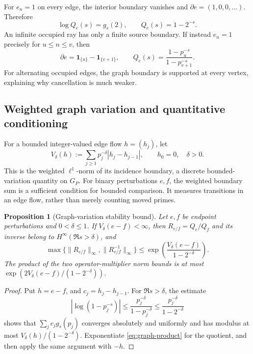 \documentclass[12pt,letterpaper]{article}
\newtheorem{proposition}[theorem]{Proposition}
\theoremstyle{definition}
\theoremstyle{remark}
\begin{document}
For \(e_n=1\) on every edge, the interior boundary vanishes and
\(\partial e=(1,0,0,\ldots)\).  Therefore
\[
 \log Q_e(s)=g_s(2),\qquad Q_e(s)=1-2^{-s}.
\]
An infinite occupied ray has only a finite source boundary.  If instead
\(e_n=1\) precisely for \(u\le n\le v\), then
\[
 \partial e=\mathbf 1_{\{u\}}-\mathbf 1_{\{v+1\}},
 \qquad Q_e(s)=\frac{1-p_u^{-s}}{1-p_{v+1}^{-s}}.
\]
For alternating occupied edges, the graph boundary is supported at
every vertex, explaining why cancellation is much weaker.

\subsection{Weighted graph variation and quantitative conditioning}

For a bounded integer-valued edge flow \(h=(h_j)\), let
\begin{equation}\label{eq:graph-TV}
 V_\delta(h):=\sum_{j\ge1}p_j^{-\delta}
                  |h_j-h_{j-1}|,\qquad h_0=0,\quad\delta>0.
\end{equation}
This is the weighted \(\ell^1\)-norm of its incidence boundary,
a discrete bounded-variation quantity on \(G_P\).
For binary perturbations $e,f$, the weighted boundary sum is a sufficient
condition for bounded comparison. It measures transitions in an edge flow,
rather than merely counting moved primes.

\begin{proposition}[Graph-variation stability bound]
\label{prop:graph-conditioning}
Let \(e,f\) be endpoint perturbations and \(0<\delta\le1\).
If \(V_\delta(e-f)<\infty\), then
\(R_{e/f}=Q_e/Q_f\) and its inverse belong to
\(H^\infty(\Re s>\delta)\), and
\begin{equation}\label{eq:graph-stability}
 \max\{\|R_{e/f}\|_\infty,\|R_{e/f}^{-1}\|_\infty\}
 \le \exp\!\left(\frac{V_\delta(e-f)}{1-2^{-\delta}}\right).
\end{equation}
The product of the two operator-multiplier norm bounds is at most
\(\exp(2V_\delta(e-f)/(1-2^{-\delta}))\).
\end{proposition}
\begin{proof}
Put \(h=e-f\), and \(c_j=h_j-h_{j-1}\).
For \(\Re s>\delta\), the estimate
\[
 |\log(1-p_j^{-s})|
 \le \frac{p_j^{-\delta}}{1-p_j^{-\delta}}
 \le \frac{p_j^{-\delta}}{1-2^{-\delta}}
\]
shows that \(\sum_j c_jg_s(p_j)\) converges absolutely and uniformly
and has modulus at most
\(V_\delta(h)/(1-2^{-\delta})\).
Exponentiate \eqref{eq:graph-product} for the quotient, and then
apply the same argument with \(-h\).
\end{proof}
\end{document}
